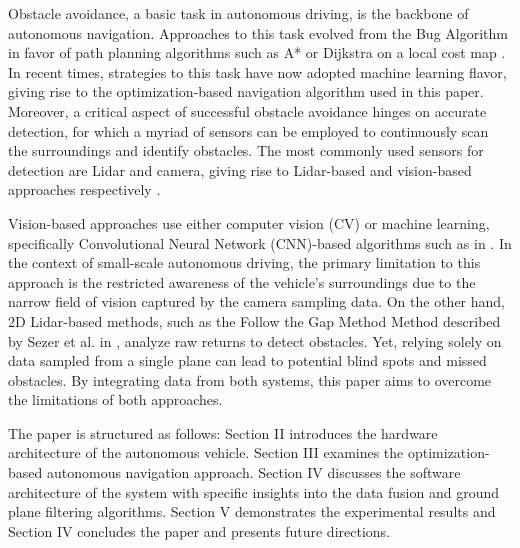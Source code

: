 \documentclass[conference]{IEEEtran}
\begin{document}

 Obstacle avoidance, a basic task in autonomous driving, is the backbone of autonomous navigation. Approaches to this task evolved from the Bug Algorithm in favor of path planning algorithms such as A* or Dijkstra on a local cost map \cite{b1}. In recent times, strategies to this task have now adopted machine learning flavor, giving rise to the optimization-based navigation algorithm used in this paper. 
 Moreover, a critical aspect of successful obstacle avoidance hinges on accurate detection, for which a myriad of sensors can be employed to continuously scan the surroundings and identify obstacles. The most commonly used sensors for detection are Lidar and camera, giving rise to Lidar-based and vision-based approaches respectively \cite{b2}. 
 
 Vision-based approaches use either computer vision (CV) or machine learning, specifically Convolutional Neural Network (CNN)-based algorithms such as in \cite{b3}. In the context of small-scale autonomous driving, the primary limitation to this approach is the restricted awareness of the vehicle's surroundings due to the narrow field of vision captured by the camera sampling data. On the other hand, 2D Lidar-based methods, such as the Follow the Gap Method Method described by Sezer et al. in \cite{b4}, analyze raw returns to detect obstacles. Yet, relying solely on data sampled from a single plane can lead to potential blind spots and missed obstacles. By integrating data from both systems, this paper aims to overcome the limitations of both approaches.


The paper is structured as follows: Section II introduces the hardware architecture of the autonomous vehicle. Section III examines the optimization-based autonomous navigation approach. Section IV discusses the software architecture of the system with specific insights into the data fusion and ground plane filtering algorithms. Section V demonstrates the experimental results and Section IV concludes the paper and presents future directions. 
\end{document}
